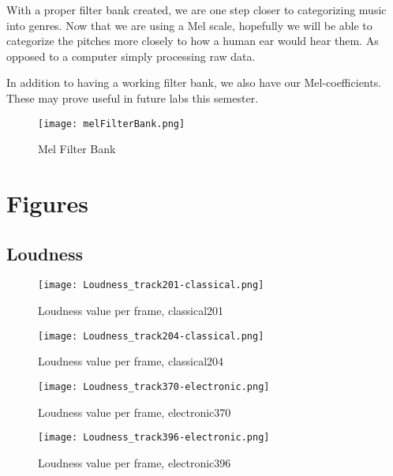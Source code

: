 \documentclass{article} %
\begin{document}
With a proper filter bank created, we are one step closer to categorizing music into genres. Now that we are using a Mel scale, hopefully we will be able to categorize the pitches
more closely to how a human ear would hear them. As opposed to a computer simply processing raw data. 


In addition to having a working filter bank, we also have our Mel-coefficients. These may prove useful in future labs this semester. 


\begin{figure}[H]
\centering
\texttt{[image: melFilterBank.png]}
\caption{Mel Filter Bank}
\label{fig:mel_Bank}
\end{figure}







\clearpage
\appendix
\section{Figures}
\subsection{Loudness}
\label{sec:LoudnessFigures}

\begin{figure}[h]
\centering
\texttt{[image: Loudness\_track201-classical.png]}
\caption{Loudness value per frame, classical201}
\label{fig:loudness_201}
\end{figure}

\begin{figure}
\centering
\vspace{-400em}
\texttt{[image: Loudness\_track204-classical.png]}
\caption{Loudness value per frame, classical204}
\label{fig:loudness_204}
\end{figure}

\begin{figure}
\centering
\texttt{[image: Loudness\_track370-electronic.png]}
\caption{Loudness value per frame, electronic370}
\label{fig:loudness_370}
\end{figure}

\begin{figure}
\centering
\texttt{[image: Loudness\_track396-electronic.png]}
\caption{Loudness value per frame, electronic396}
\label{fig:loudness_396}
\end{figure}
\end{document}
